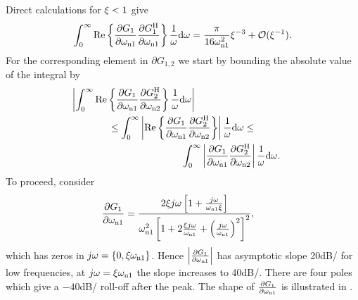 Direct calculations for $\damping < 1$ give
\begin{align}
\label{eq:excitation:auto}
\int_0^\infty\mathrm{Re}\left\{\frac{\partial G_1}{\partial \wn[1]}\frac{\partial G_1^{\HT}}{\partial \wn[1]}\right\}\frac{1}{\omega}\dd\omega = \frac{\pi}{16\wn[1]^2}\damping^{-3} + \mathcal{O}(\damping^{-1}).
\end{align}
For the corresponding element in $\partial G_{1,2}$ we start by bounding the absolute value of the integral by
\begin{gather}
\left|\int_0^\infty\mathrm{Re}\left\{\frac{\partial G_1}{\partial \wn[1]}\frac{\partial G_2^{\HT}}{\partial \wn[2]}\right\}\frac{1}{\omega}\dd\omega\right|
\qquad \qquad \qquad \qquad \qquad
\label{eq:excitation:cross1} \\
\leq
\int_0^\infty\left|\mathrm{Re}\left\{\frac{\partial G_1}{\partial \wn[1]}\frac{\partial G_2^{\HT}}{\partial \wn[2]}\right\}\right|\frac{1}{\omega}\dd\omega
\leq \\
\qquad \qquad \qquad \qquad \qquad
\int_0^\infty\left|\frac{\partial G_1}{\partial \wn[1]}\frac{\partial G_2^{\HT}}{\partial \wn[2]}\right|\frac{1}{\omega}\dd\omega \text{.}\label{eq:excitation:cross}
\end{gather}
To proceed, consider
\begin{align}
\frac{\partial G_1}{\partial \wn[1]} 
  &= \frac{2\damping j\omega\left[1+\frac{j\omega}{\wn[1]\damping}\right]}
  {\wn[1]^2\left[1+2\frac{\damping j\omega}{\wn[1]} + \left(\frac{j\omega}{\wn[1]}\right)^2\right]^2},
\end{align}
which has zeros in $j\omega=\left\{0, \damping\wn[1]\right\}$. 
Hence $\left|\frac{\partial G_1}{\partial \wn[1]} \right|$ has asymptotic slope 20\unit{dB/\decade} for low frequencies, at $j\omega=\damping\wn[1]$ the slope increases to 40\unit{dB/\decade}. 
There are four poles which give a $-40$\unit{dB/\decade} roll-off after the peak. 
The shape of $\frac{\partial G_1}{\partial \wn[1]} $ is illustrated in .

